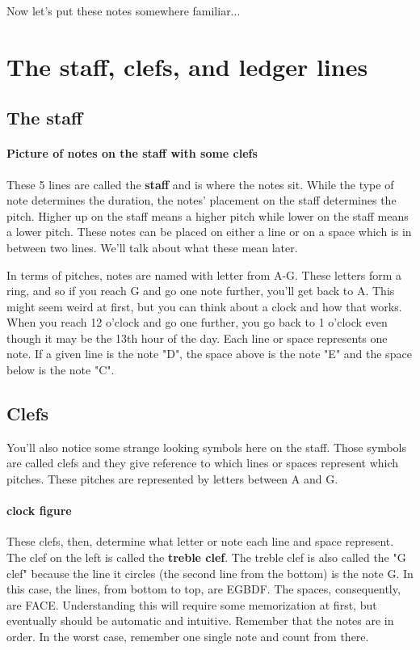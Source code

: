 \documentclass[../OpenAppliedMusicTheory.tex]{subfiles}
\begin{document}
        Now let's put these notes somewhere familiar...

    \section{The staff, clefs, and ledger lines}\label{ch1:staff}
        \subsection{The staff}
        \paragraph{Picture of notes on the staff with some clefs}
        
        These 5 lines are called the \textbf{staff} and is where the notes sit. While the type of note determines the duration, the notes' placement on the staff determines the pitch. Higher up on the staff means a higher pitch while lower on the staff means a lower pitch. These notes can be placed on either a line or on a space which is in between two lines. We'll talk about what these mean later.

        In terms of pitches, notes are named with letter from A-G. These letters form a ring, and so if you reach G and go one note further, you'll get back to A. This might seem weird at first, but you can think about a clock and how that works. When you reach 12 o'clock and go one further, you go back to 1 o'clock even though it may be the 13th hour of the day. Each line or space represents one note. If a given line is the note "D", the space above is the note "E" and the space below is the note "C".

        \subsection{Clefs}
        You'll also notice some strange looking symbols here on the staff. Those symbols are called clefs and they give reference to which lines or spaces represent which pitches. These pitches are represented by letters between A and G. 

        \paragraph{clock figure}

        These clefs, then, determine what letter or note each line and space represent. The clef on the left is called the \textbf{treble clef}. The treble clef is also called the "G clef" because the line it circles (the second line from the bottom) is the note G. In this case, the lines, from bottom to top, are EGBDF. The spaces, consequently, are FACE. Understanding this will require some memorization at first, but eventually should be automatic and intuitive. Remember that the notes are in order. In the worst case, remember one single note and count from there.
\end{document}
